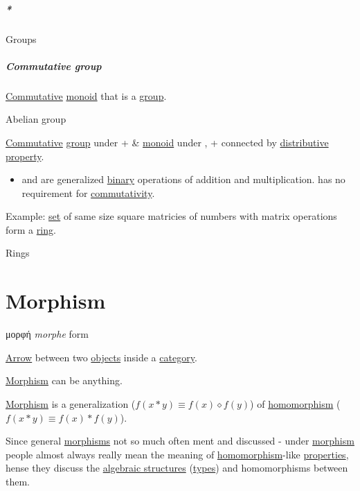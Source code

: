 \documentclass[a4paper,14pt,oneside]{book}
\begin{document}
\subparagraph{\emph{*}}
\label{sec:orgc4e095c}

\label{org22a0dcc}Groups

\subparagraph{\label{orged3c5bf}Commutative group}
\label{sec:org7f3c018}
\hyperref[orge41dfdf]{Commutative} \hyperref[org2993534]{monoid} that is a \hyperref[org3edd667]{group}.

\subsubparagraph{\emph{*}}
\label{sec:org70e82f2}

\label{org008d4a8}Abelian group

\label{sec:orgaa890bd}
\hyperref[orge41dfdf]{Commutative} \hyperref[org3edd667]{group} under + \& \hyperref[org2993534]{monoid} under \texttimes{}, + \texttimes{} connected by \hyperref[orgdf06610]{distributive} \hyperref[org979fccb]{property}.

\begin{itemize}
\item and \texttimes{} are generalized \hyperref[org7cc4f14]{binary} operations of addition and multiplication. \texttimes{} has no requirement for \hyperref[orgea518e8]{commutativity}.
\end{itemize}

Example: \hyperref[orga96bc87]{set} of same size square matricies of numbers with matrix operations form a \hyperref[org982fa3e]{ring}.

\subsubsubparagraph{\emph{*}}
\label{sec:orgb477990}

\label{orgd52aea3}Rings

\section{\label{org7b946a3}Morphism}
\label{sec:orge184c38}
\textgreek{μορφή} \emph{morphe} form

\hyperref[org33124e1]{Arrow} between two \hyperref[org07ba60b]{objects} inside a \hyperref[org42f63ac]{category}.

\hyperref[org7b946a3]{Morphism} can be anything.

\hyperref[org7b946a3]{Morphism} is a generalization (\(f(x*y) \equiv f(x) \diamond f(y)\)) of \hyperref[org9432366]{homomorphism} (\(f(x*y) \equiv f(x) * f(y)\)).

Since general \hyperref[org81cc7d1]{morphisms} not so much often ment and discussed - under \hyperref[org7b946a3]{morphism} people almost always really mean the meaning of \hyperref[org9432366]{homomorphism}-like \hyperref[orgb2bc092]{properties}, hense they discuss the \hyperref[org14a7d0b]{algebraic structures} (\hyperref[orgfd19782]{types}) and homomorphisms between them.
\end{document}
